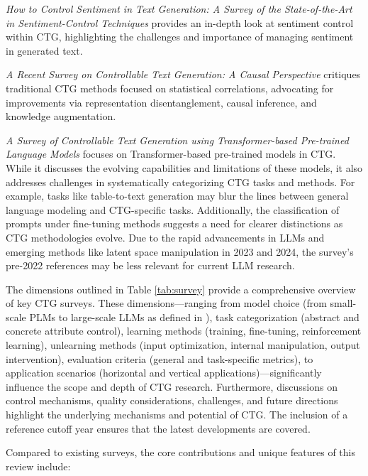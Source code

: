 \documentclass[acmsmall, screen]{acmart}
\begin{document}
\textit{How to Control Sentiment in Text Generation: A Survey of the State-of-the-Art in Sentiment-Control Techniques} \cite{lorandi_WASSA23_sentimentCTG} provides an in-depth look at sentiment control within CTG, highlighting the challenges and importance of managing sentiment in generated text.

\textit{A Recent Survey on Controllable Text Generation: A Causal Perspective} \cite{wang_2024_CausalCTG} critiques traditional CTG methods focused on statistical correlations, advocating for improvements via representation disentanglement, causal inference, and knowledge augmentation.

\textit{A Survey of Controllable Text Generation using Transformer-based Pre-trained Language Models} \cite{zhang_ACMCS23_CTGSurvey} focuses on Transformer-based pre-trained models in CTG. While it discusses the evolving capabilities and limitations of these models, it also addresses challenges in systematically categorizing CTG tasks and methods. For example, tasks like table-to-text generation may blur the lines between general language modeling and CTG-specific tasks. Additionally, the classification of prompts under fine-tuning methods suggests a need for clearer distinctions as CTG methodologies evolve. Due to the rapid advancements in LLMs and emerging methods like latent space manipulation in 2023 and 2024, the survey's pre-2022 references may be less relevant for current LLM research.



The dimensions outlined in Table \ref{tab:survey} provide a comprehensive overview of key CTG surveys. These dimensions—ranging from model choice (from small-scale PLMs to large-scale LLMs as defined in \cite{zhao_arxiv23_LLMSurvey}), task categorization (abstract and concrete attribute control), learning methods (training, fine-tuning, reinforcement learning), unlearning methods (input optimization, internal manipulation, output intervention), evaluation criteria (general and task-specific metrics), to application scenarios (horizontal and vertical applications)—significantly influence the scope and depth of CTG research. Furthermore, discussions on control mechanisms, quality considerations, challenges, and future directions highlight the underlying mechanisms and potential of CTG. The inclusion of a reference cutoff year ensures that the latest developments are covered.

Compared to existing surveys, the core contributions and unique features of this review include:
\end{document}
